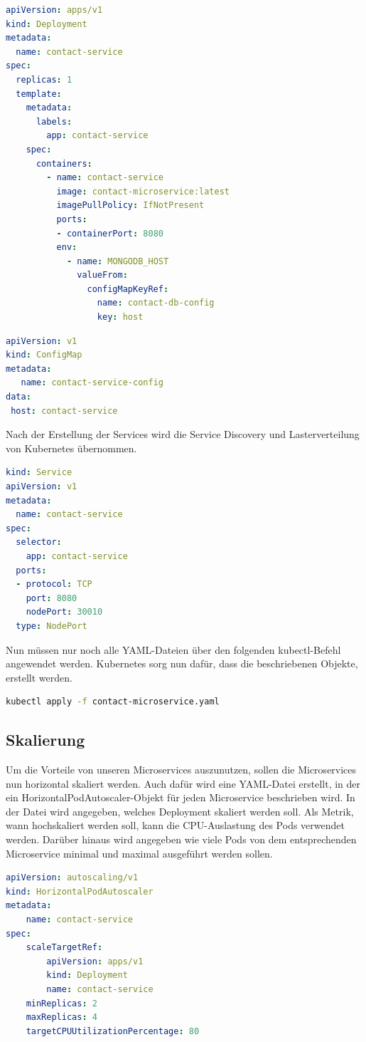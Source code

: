 \begin{lstlisting}[language=YAML, caption=Befehl]
apiVersion: apps/v1
kind: Deployment
metadata:
  name: contact-service
spec:
  replicas: 1
  template:
    metadata:
      labels:
        app: contact-service
    spec:
      containers:
        - name: contact-service
          image: contact-microservice:latest
          imagePullPolicy: IfNotPresent
          ports:
          - containerPort: 8080
          env:
            - name: MONGODB_HOST
              valueFrom:
                configMapKeyRef:
                  name: contact-db-config  
                  key: host
\end{lstlisting}

\begin{lstlisting}[language=YAML, morekeywords=host, caption=Befehl , captionpos=b]
apiVersion: v1
kind: ConfigMap
metadata:
   name: contact-service-config
data:
 host: contact-service
\end{lstlisting}

Nach der Erstellung der Services wird die Service Discovery und Lasterverteilung von Kubernetes übernommen. 

\begin{lstlisting}[language=YAML, caption=Befehl , captionpos=b]
kind: Service
apiVersion: v1
metadata:
  name: contact-service
spec:
  selector:
    app: contact-service
  ports:
  - protocol: TCP
    port: 8080
    nodePort: 30010
  type: NodePort
\end{lstlisting}

Nun müssen nur noch alle YAML-Dateien über den folgenden kubectl-Befehl angewendet werden. Kubernetes sorg nun dafür, dass die beschriebenen Objekte, erstellt werden.

\begin{lstlisting}[language=bash, caption=Befehl , captionpos=b]
kubectl apply -f contact-microservice.yaml
\end{lstlisting}

\subsection{Skalierung}

Um die Vorteile von unseren Microservices auszunutzen, sollen die Microservices nun horizontal skaliert werden. Auch dafür wird eine YAML-Datei erstellt, in der ein HorizontalPodAutoscaler-Objekt für jeden Microservice beschrieben wird. In der Datei wird angegeben, welches Deployment skaliert werden soll. Als Metrik, wann hochskaliert werden soll, kann die CPU-Auslastung des Pods verwendet werden. Darüber hinaus wird angegeben wie viele Pods von dem entsprechenden Microservice minimal und maximal ausgeführt werden sollen.

\begin{lstlisting}[language=YAML, caption=Befehl , captionpos=b]
apiVersion: autoscaling/v1
kind: HorizontalPodAutoscaler
metadata:
    name: contact-service
spec:
    scaleTargetRef:
        apiVersion: apps/v1
        kind: Deployment
        name: contact-service
    minReplicas: 2
    maxReplicas: 4
    targetCPUUtilizationPercentage: 80
\end{lstlisting}
